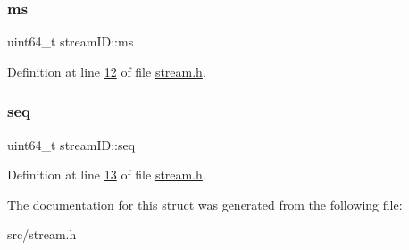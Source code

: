 \subsubsection{\texorpdfstring{ms}{ms}}
{\footnotesize\ttfamily uint64\+\_\+t stream\+I\+D\+::ms}



Definition at line \hyperlink{stream_8h_source_l00012}{12} of file \hyperlink{stream_8h_source}{stream.\+h}.

\mbox{\label{structstreamID_a5348670bb3305c4b9f50b93e212a99a0}} 
\subsubsection{\texorpdfstring{seq}{seq}}
{\footnotesize\ttfamily uint64\+\_\+t stream\+I\+D\+::seq}



Definition at line \hyperlink{stream_8h_source_l00013}{13} of file \hyperlink{stream_8h_source}{stream.\+h}.



The documentation for this struct was generated from the following file\+:\begin{DoxyCompactItemize}
\item 
src/stream.\+h\end{DoxyCompactItemize}
